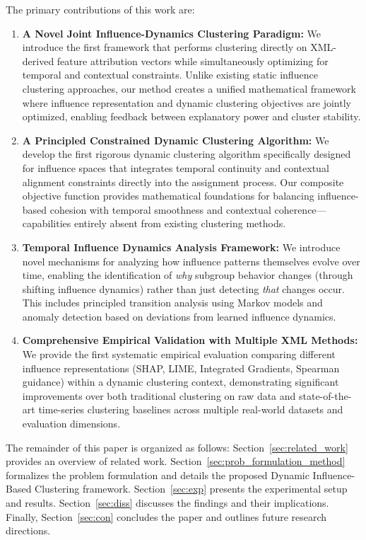 \documentclass[final,authoryear,3p,times,review,sort&compress]{elsarticle}
\begin{document}
The primary contributions of this work are:
\begin{enumerate}
    \item \textbf{A Novel Joint Influence-Dynamics Clustering Paradigm:} We introduce the first framework that performs clustering directly on XML-derived feature attribution vectors while simultaneously optimizing for temporal and contextual constraints. Unlike existing static influence clustering approaches, our method creates a unified mathematical framework where influence representation and dynamic clustering objectives are jointly optimized, enabling feedback between explanatory power and cluster stability.
    \item \textbf{A Principled Constrained Dynamic Clustering Algorithm:} We develop the first rigorous dynamic clustering algorithm specifically designed for influence spaces that integrates temporal continuity and contextual alignment constraints directly into the assignment process. Our composite objective function provides mathematical foundations for balancing influence-based cohesion with temporal smoothness and contextual coherence—capabilities entirely absent from existing clustering methods.
    \item \textbf{Temporal Influence Dynamics Analysis Framework:} We introduce novel mechanisms for analyzing how influence patterns themselves evolve over time, enabling the identification of \textit{why} subgroup behavior changes (through shifting influence dynamics) rather than just detecting \textit{that} changes occur. This includes principled transition analysis using Markov models and anomaly detection based on deviations from learned influence dynamics.
    \item \textbf{Comprehensive Empirical Validation with Multiple XML Methods:} We provide the first systematic empirical evaluation comparing different influence representations (SHAP, LIME, Integrated Gradients, Spearman guidance) within a dynamic clustering context, demonstrating significant improvements over both traditional clustering on raw data and state-of-the-art time-series clustering baselines across multiple real-world datasets and evaluation dimensions.
\end{enumerate}

The remainder of this paper is organized as follows: Section~\ref{sec:related_work} provides an overview of related work. Section~\ref{sec:prob_formulation_method} formalizes the problem formulation and details the proposed Dynamic Influence-Based Clustering framework. Section~\ref{sec:exp} presents the experimental setup and results. Section~\ref{sec:diss} discusses the findings and their implications. Finally, Section~\ref{sec:con} concludes the paper and outlines future research directions.
\end{document}
